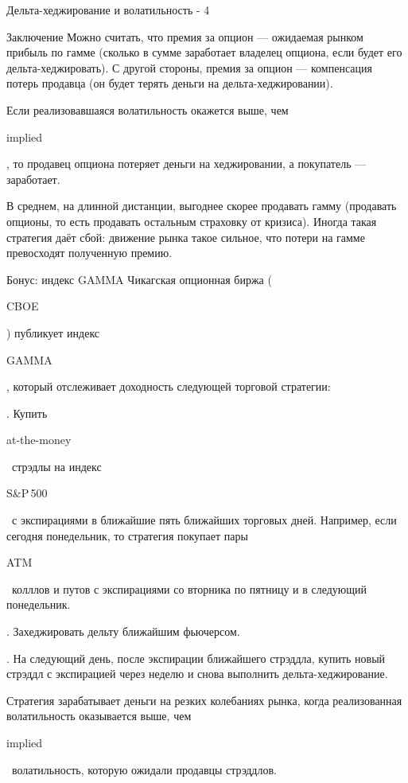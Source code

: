 \documentclass{beamer}
\newcommand{\en}[1]{\begin{otherlanguage}{english}#1\end{otherlanguage}}
\begin{document}
\begin{frame}{Дельта-хеджирование и волатильность - 4}
\centering
{}
\end{frame}



\begin{frame}{Заключение}
\justify
Можно считать, что премия за опцион --- ожидаемая рынком прибыль по гамме (сколько в 
сумме заработает владелец опциона, если будет его дельта-хеджировать). С другой 
стороны, премия за опцион --- компенсация потерь продавца (он будет терять деньги на дельта-хеджировании).

\justify
Если реализовавшаяся волатильность окажется выше, чем \en{implied}, то продавец опциона
потеряет деньги на хеджировании, а покупатель --- заработает.

\justify
В среднем, на длинной дистанции, выгоднее скорее продавать гамму (продавать опционы, то
есть продавать остальным страховку от кризиса). Иногда такая стратегия даёт сбой: 
движение рынка такое сильное, что потери на гамме превосходят полученную премию. 
\end{frame}



\begin{frame}{Бонус: индекс GAMMA}
\justify
Чикагская опционная биржа (\en{CBOE}) публикует индекс \en{GAMMA}, который отслеживает доходность следующей торговой стратегии:

. Купить \en{at-the-money}\ стрэдлы на индекс \en{S\&P\,500}\ с экспирациями в ближайшие пять ближайших торговых дней. Например, если сегодня понедельник, то стратегия покупает пары \en{ATM}\ колллов и путов с экспирациями со вторника по пятницу и в следующий понедельник.

. Захеджировать дельту ближайшим фьючерсом.

. На следующий день, после экспирации ближайшего стрэддла, купить новый стрэддл с экспирацией через неделю и снова выполнить дельта-хеджирование.

\justify
Стратегия зарабатывает деньги на резких колебаниях рынка, когда реализованная волатильность оказывается выше, чем \en{implied}\ волатильность, которую ожидали продавцы стрэддлов.
\end{frame}
\end{document}
